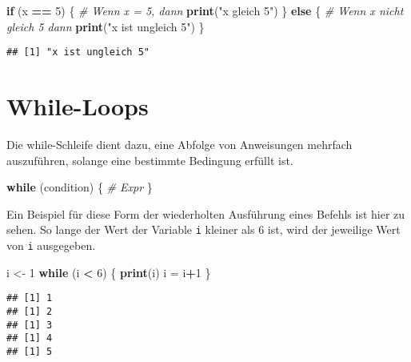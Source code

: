 \documentclass[
]{book}
\newenvironment{Shaded}{\begin{snugshade}}{\end{snugshade}}
\newcommand{\CommentTok}[1]{\textcolor[rgb]{0.56,0.35,0.01}{\textit{#1}}}
\newcommand{\ControlFlowTok}[1]{\textcolor[rgb]{0.13,0.29,0.53}{\textbf{#1}}}
\newcommand{\DecValTok}[1]{\textcolor[rgb]{0.00,0.00,0.81}{#1}}
\newcommand{\KeywordTok}[1]{\textcolor[rgb]{0.13,0.29,0.53}{\textbf{#1}}}
\newcommand{\NormalTok}[1]{#1}
\newcommand{\OperatorTok}[1]{\textcolor[rgb]{0.81,0.36,0.00}{\textbf{#1}}}
\newcommand{\StringTok}[1]{\textcolor[rgb]{0.31,0.60,0.02}{#1}}
\begin{document}
\begin{Shaded}
\begin{Highlighting}[]
\ControlFlowTok{if}\NormalTok{ (x }\OperatorTok{==}\StringTok{ }\DecValTok{5}\NormalTok{) \{ }\CommentTok{# Wenn x = 5, dann}
  \KeywordTok{print}\NormalTok{(}\StringTok{"x gleich 5"}\NormalTok{)}
\NormalTok{\} }\ControlFlowTok{else}\NormalTok{ \{ }\CommentTok{# Wenn x nicht gleich 5 dann}
  \KeywordTok{print}\NormalTok{(}\StringTok{"x ist ungleich 5"}\NormalTok{)}
\NormalTok{\}}
\end{Highlighting}
\end{Shaded}

\begin{verbatim}
## [1] "x ist ungleich 5"
\end{verbatim}

\hypertarget{while-loops}{%
\section{While-Loops}\label{while-loops}}

Die while-Schleife dient dazu, eine Abfolge von Anweisungen mehrfach auszuführen, solange eine bestimmte Bedingung erfüllt ist.

\begin{Shaded}
\begin{Highlighting}[]
\ControlFlowTok{while}\NormalTok{ (condition) \{}
  \CommentTok{# Expr}
\NormalTok{\}}
\end{Highlighting}
\end{Shaded}

Ein Beispiel für diese Form der wiederholten Ausführung eines Befehls ist hier zu sehen. So lange der Wert der Variable \texttt{i} kleiner als 6 ist, wird der jeweilige Wert von \texttt{i} ausgegeben.

\begin{Shaded}
\begin{Highlighting}[]
\NormalTok{i <-}\StringTok{ }\DecValTok{1}
\ControlFlowTok{while}\NormalTok{ (i }\OperatorTok{<}\StringTok{ }\DecValTok{6}\NormalTok{) \{}
  \KeywordTok{print}\NormalTok{(i)}
\NormalTok{  i =}\StringTok{ }\NormalTok{i}\OperatorTok{+}\DecValTok{1}
\NormalTok{\}}
\end{Highlighting}
\end{Shaded}

\begin{verbatim}
## [1] 1
## [1] 2
## [1] 3
## [1] 4
## [1] 5
\end{verbatim}
\end{document}
